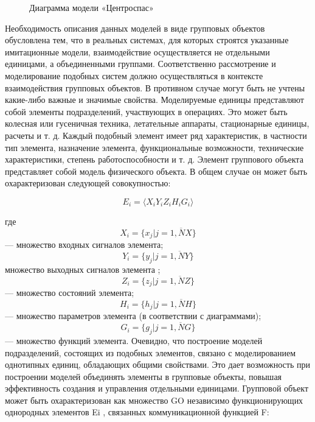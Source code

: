 \documentclass[12pt]{article}
\begin{document}
\begin{figure}
\caption{Диаграмма модели «Центроспас»}
\end{figure}


Необходимость описания данных моделей в виде
групповых объектов обусловлена тем, что в реальных
системах, для которых строятся указанные имитационные модели, взаимодействие осуществляется не отдельными единицами, а объединенными группами. Соответственно рассмотрение и моделирование подобных
систем должно осуществляться в контексте взаимодействия групповых объектов. В противном случае могут
быть не учтены какие-либо важные и значимые
свойства.
Моделируемые единицы представляют собой элементы подразделений, участвующих в операциях. Это
может быть колесная или гусеничная техника, летательные аппараты, стационарные единицы, расчеты
и т. д. Каждый подобный элемент имеет ряд характеристик, в частности тип элемента, назначение элемента,
функциональные возможности, технические характеристики, степень работоспособности и т. д. Элемент
группового объекта представляет собой модель физического объекта. В общем случае он может быть охарактеризован следующей совокупностью:

\[E_{i}=\langle X_{i}Y_{i}Z_{i} H_{i}G_{i} \rangle \]

 где
\[X_{i}=\{ x_{j}|j = \overline{1,NX}\}\]
 — множество входных сигналов элемента;
\[Y_{i}=\{ y_{j}|j = \overline{1,NY}\}\]
множество выходных сигналов элемента ;
\[Z_{i}=\{ z_{j}|j = \overline{1,NZ}\}\]
 — множество состояний элемента;
\[H_{i}=\{ h_{j}|j = \overline{1,NH}\}\]
 — множество параметров элемента
(в соответствии с диаграммами); 
\[G_{i}=\{ g_{j}|j = \overline{1,NG}\}\]
— множество функций элемента.
Очевидно, что построение моделей подразделений,
состоящих из подобных элементов, связано с моделированием однотипных единиц, обладающих общими
свойствами. Это дает возможность при построении моделей объединять элементы в групповые объекты, повышая эффективность создания и управления отдельными единицами.
Групповой объект может быть охарактеризован как
множество GO независимо функционирующих однородных элементов Ei
, связанных коммуникационной
функцией F:
\end{document}
